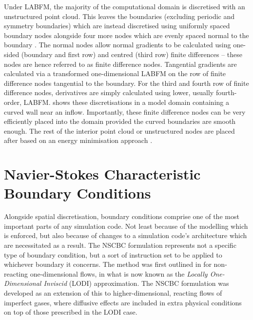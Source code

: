 Under LABFM, the majority of the computational domain is discretised with an unstructured point cloud. This leaves the boundaries (excluding periodic and symmetry boundaries) which are instead discretised using uniformly spaced boundary nodes alongside four more nodes which are evenly spaced normal to the boundary \cite{king2022HighOrderSimulationsIsothermal}. The normal nodes allow normal gradients to be calculated using one-sided (boundary and first row) and centred (third row) finite differences -- these nodes are hence referred to as finite difference nodes. Tangential gradients are calculated via a transformed one-dimensional LABFM on the row of finite difference nodes tangential to the boundary. For the third and fourth row of finite difference nodes, derivatives are simply calculated using lower, usually fourth-order, LABFM.  shows these discretisations in a model domain containing a curved wall near an inflow. Importantly, these finite difference nodes can be very efficiently placed into the domain provided the curved boundaries are smooth enough. The rest of the interior point cloud or unstructured nodes are placed after based on an energy minimisation approach \cite{king2020HighOrderDifference}.





\section{Navier-Stokes Characteristic Boundary Conditions} \label{sec:NSCBC}

Alongside spatial discretisation, boundary conditions comprise one of the most important parts of any simulation code. Not least because of the modelling which is enforced, but also because of changes to a simulation code's architecture which are necessitated as a result. The NSCBC \cite{poinsot1992BoundaryConditionsDirect,poinsot2001TheoreticalNumericalCombustion} formulation represents not a specific type of boundary condition, but a sort of instruction set to be applied to whichever boundary it concerns. The method was first outlined in \cite{thompson1987TimeDependentBoundary,thompson1987LecturesSeriesComputational,thompson1990TimeDependentBoundaryConditions} for non-reacting one-dimensional flows, in what is now known as the \emph{Locally One-Dimensional Inviscid} (LODI) approximation. The NSCBC formulation was developed as an extension of this to higher-dimensional, reacting flows of imperfect gases, where diffusive effects are included in extra physical conditions on top of those prescribed in the LODI case.



